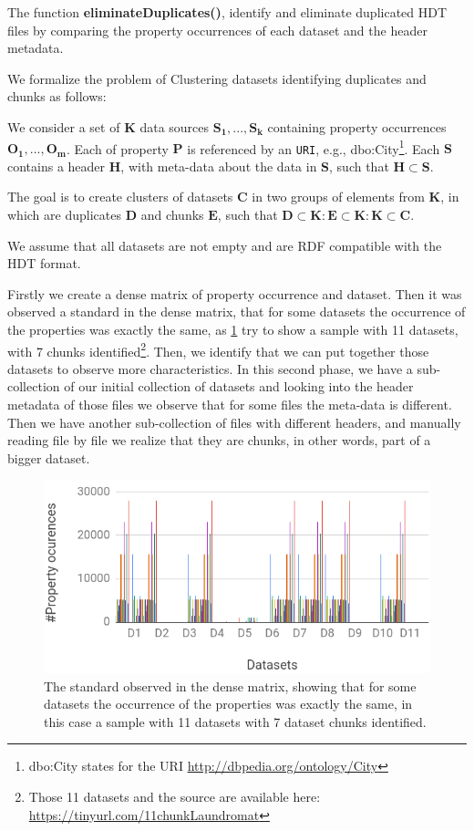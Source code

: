 \documentclass[sw]{iosart2x}
\begin{document}
The function \textbf{eliminateDuplicates()}, identify and eliminate duplicated HDT files by comparing the property occurrences of each dataset and the header metadata.

We formalize the problem of Clustering datasets identifying duplicates and chunks as follows:

We consider a set of $\mathbf{K}$ data sources $\mathbf{S_1}, . . . , \mathbf{S_k}$ containing property occurrences $\mathbf{O_1}, . . . , \mathbf{O_m}$. Each of property $\mathbf{P}$ is referenced by an \texttt{URI}, e.g., dbo:City\footnote{dbo:City states for the URI \url{http://dbpedia.org/ontology/City}}. Each $\mathbf{S}$ contains a header $\mathbf{H}$, with meta-data about the data in $\mathbf{S}$, such that $\mathbf{H} \subset \mathbf{S}$.

The goal is to create clusters of datasets $\mathbf{C}$ in two groups of elements from $\mathbf{K}$, in which are duplicates $\mathbf{D}$ and chunks $\mathbf{E}$, such that $\mathbf{D} \subset \mathbf{K} : \mathbf{E} \subset \mathbf{K} : \mathbf{K} \subset \mathbf{C}$.

We assume that all datasets are not empty and are RDF compatible with the HDT format.

Firstly we create a dense matrix of property occurrence and dataset. Then it was observed a standard in the dense matrix, that for some datasets the occurrence of the properties was exactly the same, as  \cref{fig:propOccurence} try to show a sample with 11 datasets, with 7 chunks identified\footnote{Those 11 datasets and the source are available here: \url{https://tinyurl.com/11chunkLaundromat}}. Then, we identify that we can put together those datasets to observe more characteristics.
In this second phase, we have a sub-collection of our initial collection of datasets and looking into the header metadata of those files we observe that for some files the meta-data is different. Then we have another sub-collection of files with different headers, and manually reading file by file we realize that they are chunks, in other words, part of a bigger dataset. 

\begin{figure}[htb] 
    \centering
 	\includegraphics[width=0.8\linewidth]{img/propertyOccurence.png}
 	\caption{The standard observed in the dense matrix, showing that for some datasets the occurrence of the properties was exactly the same, in this case a sample with 11 datasets with 7 dataset chunks identified.}
 	\label{fig:propOccurence}
\end{figure}
\end{document}
